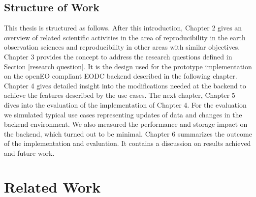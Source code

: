 \documentclass[draft,final]{vutinfth} %
\begin{document}
\section{Structure of Work}\label{Structure}
This thesis is structured as follows. After this introduction, Chapter 2 gives an overview of related scientific activities in the area of reproducibility in the earth observation sciences and reproducibility in other areas with similar objectives. Chapter 3 provides the concept to address the research questions defined in Section \ref{research question}. It is the design used for the prototype implementation on the openEO compliant EODC backend described in the following chapter. Chapter 4 gives detailed insight into the modifications needed at the backend to achieve the features described by the use cases. The next chapter, Chapter 5 dives into the evaluation of the implementation of Chapter 4. For the evaluation we simulated typical use cases representing updates of data and changes in the backend environment. We also measured the performance and storage impact on the backend, which turned out to be minimal. 
Chapter 6 summarizes the outcome of the implementation and evaluation. It contains a discussion on results achieved and future work. 

\chapter{Related Work}\label{Related Work}

\end{document}
